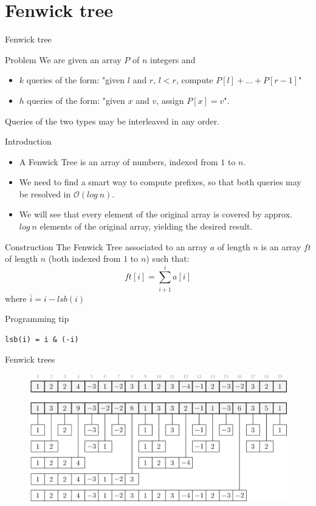 \documentclass{beamer}
\begin{document}
\section{Fenwick tree}
\begin{frame}{Fenwick tree}
\begin{block}{Problem}
We are given an array $P$ of $n$ integers and
\begin{itemize}
\item $k$ queries of the form: "given $l$ and $r$, $l < r$, compute $P[l] + \dots + P[r-1]$"
\item $h$ queries of the form: "given $x$ and $v$, assign $P[x] = v$".
\end{itemize}

Queries of the two types may be interleaved in any order.
\end{block}
\begin{block}{Introduction}
\begin{itemize}
\item A Fenwick Tree is an array of numbers, indexed from $1$ to $n$.
\item We need to find a smart way to compute prefixes, so that both queries may be resolved in $\mathcal{O}(log~n)$.
\item We will see that every element of the original array is covered by approx. $log~n$ elements of the original array, yielding the desired result.
\end{itemize}
\end{block}
\end{frame}
\begin{frame}[fragile]
\begin{block}{Construction}
The Fenwick Tree associated to an array $a$ of length $n$ is an array $ft$ of length $n$ (both indexed from $1$ to $n$) such that:
$$ ft[i] = \sum_{\bar i + 1} ^ i a[i]$$
where $\bar i = i - lsb(i)$
\end{block}
\begin{block}{Programming tip}
\begin{verbatim}
lsb(i) = i & (-i)
\end{verbatim}
\end{block}
\end{frame}

\begin{frame}{Fenwick trees}
\begin{figure}
\includegraphics[width=\textwidth]{fenwick1.png}
\end{figure}
\end{frame}
\end{document}
